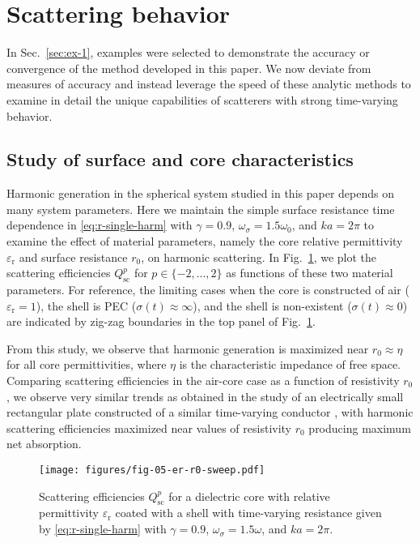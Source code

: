 \documentclass[article]{IEEEtran}
\newcommand{\T}[1]{\mathrm{#1}}
\begin{document}
\section{Scattering behavior}
\label{sec:ex-2}
In Sec.~\ref{sec:ex-1}, examples were selected to demonstrate the accuracy or convergence of the method developed in this paper.  We now deviate from measures of accuracy and instead leverage the speed of these analytic methods to examine in detail the unique capabilities of scatterers with strong time-varying behavior.

\subsection{Study of surface and core characteristics}
Harmonic generation in the spherical system studied in this paper depends on many system parameters.  Here we maintain the simple surface resistance time dependence in \eqref{eq:r-single-harm} with $\gamma = 0.9$, $\omega_\sigma = 1.5\omega_0$, and $ka = 2\pi$ to examine the effect of material parameters, namely the core relative permittivity $\varepsilon_\T{r}$ and surface resistance $r_0$, on harmonic scattering. In Fig.~\ref{fig:er-r0-sweep}, we plot the scattering efficiencies $Q_\T{sc}^p$ for $p \in \{-2,...,2\}$ as functions of these two material parameters.  For reference, the limiting cases when the core is constructed of air ($\varepsilon_\T{r}=1$), the shell is PEC ($\sigma(t)\approx\infty$), and the shell is non-existent ($\sigma(t)\approx 0$) are indicated by zig-zag boundaries in the top panel of Fig.~\ref{fig:er-r0-sweep}.

From this study, we observe that harmonic generation is maximized near $r_0\approx\eta$ for all core permittivities, where $\eta$ is the characteristic impedance of free space.  Comparing scattering efficiencies in the air-core case as a function of resistivity $r_0$, we observe very similar trends as obtained in the study of an electrically small rectangular plate constructed of a similar time-varying conductor \cite{bass2021conversion}, with harmonic scattering efficiencies maximized near values of resistivity $r_0$ producing maximum net absorption. 

\begin{figure}
    \centering
\texttt{[image: figures/fig-05-er-r0-sweep.pdf]}
    \caption{Scattering efficiencies $Q_\T{sc}^p$ for a dielectric core with relative permittivity $\varepsilon_\T{r}$ coated with a shell with time-varying resistance given by \eqref{eq:r-single-harm} with $\gamma = 0.9$, $\omega_\sigma = 1.5\omega$, and $ka = 2\pi$.}
    \label{fig:er-r0-sweep}
\end{figure}
\end{document}
